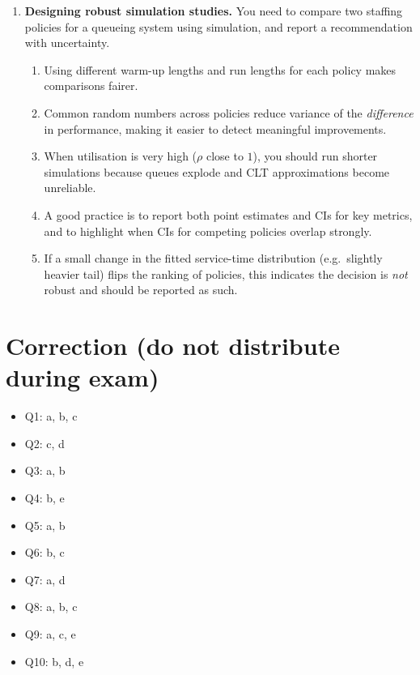 \documentclass[a4paper,11pt]{article}
\begin{document}
\begin{enumerate}
\item \textbf{Designing robust simulation studies.} You need to compare two staffing policies for a queueing system using simulation, and report a recommendation with uncertainty.
  \begin{enumerate}
    \item Using different warm-up lengths and run lengths for each policy makes comparisons fairer.
    \item Common random numbers across policies reduce variance of the \emph{difference} in performance, making it easier to detect meaningful improvements.
    \item When utilisation is very high ($\rho$ close to $1$), you should run shorter simulations because queues explode and CLT approximations become unreliable.
    \item A good practice is to report both point estimates and CIs for key metrics, and to highlight when CIs for competing policies overlap strongly.
    \item If a small change in the fitted service-time distribution (e.g.\ slightly heavier tail) flips the ranking of policies, this indicates the decision is \emph{not} robust and should be reported as such.
  \end{enumerate}

\end{enumerate}

\newpage
\section*{Correction (do not distribute during exam)}

\begin{itemize}
  \item Q1: a, b, c
  \item Q2: c, d
  \item Q3: a, b
  \item Q4: b, e
  \item Q5: a, b
  \item Q6: b, c
  \item Q7: a, d
  \item Q8: a, b, c
  \item Q9: a, c, e
  \item Q10: b, d, e
\end{itemize}
\end{document}
